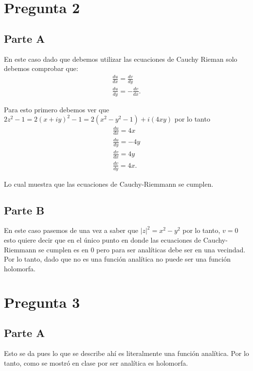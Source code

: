 \documentclass[12pt]{exam}
\begin{document}
\section*{Pregunta 2}

\subsection*{Parte A}

En este caso dado que debemos utilizar las ecuaciones de Cauchy Rieman solo debemos comprobar que:
\begin{align*}
  \frac{du}{dx} = \frac{dv}{dy}\\
  \frac{du}{dy} = - \frac{dv}{dx}
.\end{align*}

Para esto primero debemos ver que $2z^2 - 1 = 2\left( x + iy \right)^2 - 1 = 2 \left( x^2 - y^2 - 1 \right) + i\left( 4xy \right) $ por lo tanto
\begin{align*}
  \frac{du}{dx} = 4x\\
  \frac{du}{dy} =- 4y\\
  \frac{dv}{dx} = 4y\\
  \frac{dv}{dy} = 4x
.\end{align*}

Lo cual muestra que las ecuaciones de Cauchy-Riemmann se cumplen.

\subsection*{Parte B}

En este caso pasemos de una vez a saber que $|z|^2 = x^2 - y^2$ por lo tanto, $v = 0$ esto quiere decir que en el único punto en donde las ecuaciones de Cauchy-Riemmann se cumplen es en 0 pero para ser analíticas debe ser en una vecindad. Por lo tanto, dado que no es una función analítica no puede ser una función holomorfa.

\section*{Pregunta 3}

\subsection*{Parte A}

Esto se da pues lo que se describe ahí es literalmente una función analítica. Por lo tanto, como se mostró en clase por ser analítica es holomorfa.
\end{document}
